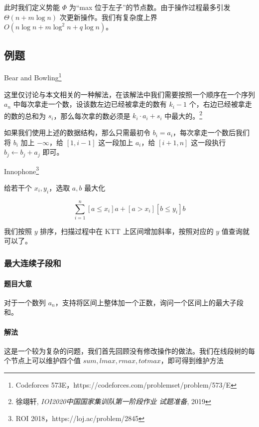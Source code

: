\documentclass{noithesis}
\begin{document}
此时我们定义势能 $\Phi$ 为“max 位于左子”的节点数。由于操作过程最多引发 $\Theta(n + m\log n)$ 次更新操作。我们有复杂度上界 $O(n\log n + m\log^2 n + q\log n)$。

\subsection{例题}

\begin{Pro} Bear and Bowling\footnote{Codeforces 573E，https://codeforces.com/problemset/problem/573/E}
\end{Pro}

这里仅讨论与本文相关的一种解法，在该解法中我们需要按照一个顺序在一个序列 $a_n$ 中每次拿走一个数，设该数左边已经被拿走的数有 $k_i - 1$ 个，右边已经被拿走的数的总和为 $s_i$，那么每次拿的数必须是 $k_i\cdot a_i + s_i$ 中最大的。\footnote{徐翊轩, \emph{IOI2020中国国家集训队第一阶段作业 试题准备}, 2019}

如果我们使用上述的数据结构，那么只需最初令 $b_i = a_i$，每次拿走一个数后我们将 $b_i$ 加上 $-\infty$，给 $[1, i - 1]$ 这一段加上 $a_i$，给 $[i + 1, n]$ 这一段执行 $b_j \leftarrow b_j + a_j$ 即可。


\begin{Pro} Innophone\footnote{ROI 2018，https://loj.ac/problem/2845}

给若干个 $x_i, y_i$，选取 $a, b$ 最大化

$$ \sum_{i=1}^n [a\le x_i]a + [a > x_i][b\le y_i]b $$
\end{Pro}

我们按照 $y$ 排序，扫描过程中在 KTT 上区间增加斜率，按照对应的 $y$ 值查询就可以了。

\subsubsection{最大连续子段和}

\paragraph{题目大意} 对于一个数列 $a_n$，支持将区间上整体加一个正数，询问一个区间上的最大子段和。

\paragraph{解法} 这是一个较为复杂的问题，我们首先回顾没有修改操作的做法。我们在线段树的每个节点上可以维护四个值 $sum, lmax, rmax, totmax$，即可得到维护方法
\end{document}
